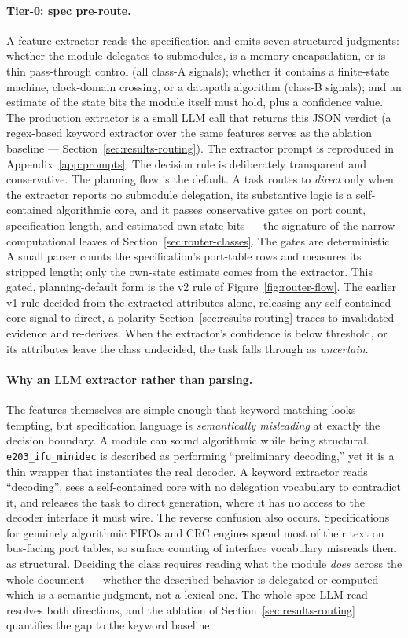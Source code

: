 \paragraph{Tier-0: spec pre-route.}
A feature extractor reads the specification and emits seven structured
judgments: whether the module delegates to submodules, is a memory
encapsulation, or is thin pass-through control (all class-A signals);
whether it contains a finite-state machine, clock-domain crossing, or a
datapath algorithm (class-B signals); and an estimate of the state bits the
module itself must hold, plus a confidence value. The production extractor
is a small LLM call that returns this JSON verdict (a regex-based keyword
extractor over the same features serves as the ablation baseline ---
Section~\ref{sec:results-routing}). The extractor prompt is reproduced
in Appendix~\ref{app:prompts}. The decision rule is deliberately
transparent and conservative. The planning flow is the default. A task
routes to \emph{direct} only when the extractor reports no submodule
delegation, its substantive logic is a self-contained algorithmic
core, and it passes conservative gates on port count, specification
length, and estimated own-state bits --- the signature of the narrow
computational leaves of Section~\ref{sec:router-classes}. The gates
are deterministic. A small parser counts the specification's
port-table rows and measures its stripped length; only the own-state
estimate comes from the extractor. This gated, planning-default form
is the v2 rule of Figure~\ref{fig:router-flow}. The earlier v1 rule
decided from the extracted attributes alone, releasing any
self-contained-core signal to direct, a polarity
Section~\ref{sec:results-routing} traces to invalidated evidence and
re-derives. When the extractor's confidence is below threshold, or
its attributes leave the class undecided, the task falls through as
\emph{uncertain}.

\paragraph{Why an LLM extractor rather than parsing.}
The features themselves are simple enough that keyword matching looks
tempting, but specification language is \emph{semantically misleading}
at exactly the decision boundary. A module can sound algorithmic while
being structural. \texttt{e203\_ifu\_minidec} is described as
performing ``preliminary decoding,'' yet it is a thin wrapper that
instantiates the real decoder. A keyword extractor reads
``decoding'', sees a self-contained core with no delegation
vocabulary to contradict it, and releases the task to direct
generation, where it has no access to the decoder interface it must
wire. The reverse confusion also occurs.
Specifications for genuinely algorithmic FIFOs and CRC engines spend
most of their text on bus-facing port tables, so surface counting of
interface vocabulary misreads them as structural. Deciding the class
requires reading what the module \emph{does} across the whole document
--- whether the described behavior is delegated or computed --- which is
a semantic judgment, not a lexical one. The whole-spec LLM read resolves
both directions, and the ablation of Section~\ref{sec:results-routing}
quantifies the gap to the keyword baseline.

